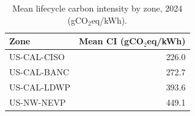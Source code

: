 \begin{table}[ht]
\centering
\caption{Mean lifecycle carbon intensity by zone, 2024 (gCO$_2$eq/kWh).}
\label{tab:means}
\begin{tabular}{lr}
\toprule
Zone & Mean CI (gCO$_2$eq/kWh) \\
\midrule
US-CAL-CISO & 226.0 \\
US-CAL-BANC & 272.7 \\
US-CAL-LDWP & 393.6 \\
US-NW-NEVP & 449.1 \\
\bottomrule
\end{tabular}
\end{table}
